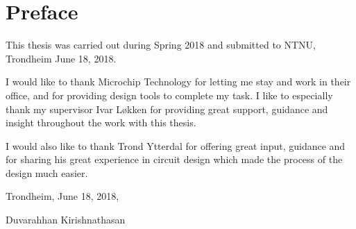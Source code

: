 \documentclass[pdftex,10pt,b5paper,twoside]{book}
\begin{document}
\chapter*{Preface}

This thesis was carried out during Spring 2018 and submitted to NTNU, Trondheim June 18, 2018. 

I would like to thank Microchip Technology for letting me stay and work in their office, and for providing design tools to complete my task. I like to especially thank my supervisor Ivar Løkken for providing great support, guidance and insight throughout the work with this thesis. 

I would also like to thank Trond Ytterdal for offering great input, guidance and for sharing his great experience in circuit design which made the process of the design much easier.

Trondheim, June 18, 2018,

Duvarahhan Kirishnathasan




\tableofcontents
\listoffigures
\listoftables

\mainmatter















\end{document}
